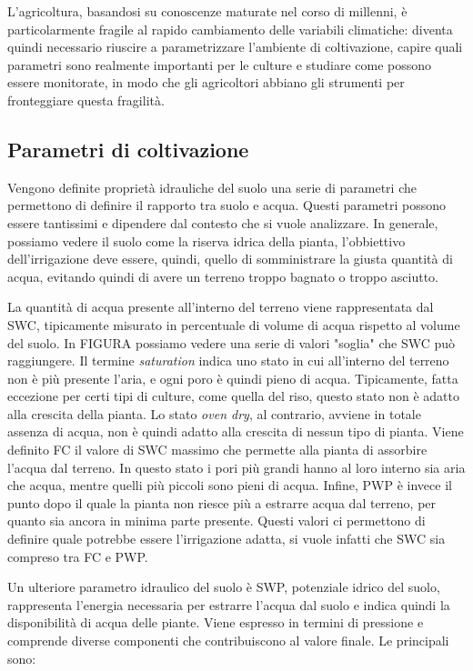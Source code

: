 \documentclass[12pt,a4paper,openright,twoside]{book}
\begin{document}
L'agricoltura, basandosi su conoscenze maturate nel corso di millenni, è particolarmente fragile al rapido cambiamento delle variabili climatiche: diventa quindi necessario riuscire a parametrizzare l'ambiente di coltivazione, capire quali parametri sono realmente importanti per le culture e studiare come possono essere monitorate, in modo che gli agricoltori abbiano gli strumenti per fronteggiare questa fragilità.

\subsection{Parametri di coltivazione}

Vengono definite proprietà idrauliche del suolo una serie di parametri che permettono di definire il rapporto tra suolo e acqua. Questi parametri possono essere tantissimi e dipendere dal contesto che si vuole analizzare.
In generale, possiamo vedere il suolo come la riserva idrica della pianta, l'obbiettivo dell'irrigazione deve essere, quindi, quello di somministrare la giusta quantità di acqua, evitando quindi di avere un terreno troppo bagnato o troppo asciutto.

La quantità di acqua presente all'interno del terreno viene rappresentata dal \ac{SWC}, tipicamente misurato in percentuale di volume di acqua rispetto al volume del suolo.
In FIGURA possiamo vedere una serie di valori "soglia" che \ac{SWC} può raggiungere.
Il termine \textit{saturation} indica uno stato in cui all'interno del terreno non è più presente l'aria, e ogni poro è quindi pieno di acqua. Tipicamente, fatta eccezione per certi tipi di culture, come quella del riso, questo stato non è adatto alla crescita della pianta.
Lo stato \textit{oven dry}, al contrario, avviene in totale assenza di acqua, non è quindi adatto alla crescita di nessun tipo di pianta.
Viene definito \ac{FC} il valore di \ac{SWC} massimo che permette alla pianta di assorbire l'acqua dal terreno. In questo stato i pori più grandi hanno al loro interno sia aria che acqua, mentre quelli più piccoli sono pieni di acqua.
Infine, \ac{PWP} è invece il punto dopo il quale la pianta non riesce più a estrarre acqua dal terreno, per quanto sia ancora in minima parte presente.
Questi valori ci permettono di definire quale potrebbe essere l'irrigazione adatta, si vuole infatti che \ac{SWC} sia compreso tra \ac{FC} e \ac{PWP}.

Un ulteriore parametro idraulico del suolo è \ac{SWP}, potenziale idrico del suolo, rappresenta l'energia necessaria per estrarre l'acqua dal suolo e indica quindi la disponibilità di acqua delle piante. Viene espresso in termini di pressione e comprende diverse componenti che contribuiscono al valore finale. Le principali sono:
\end{document}
